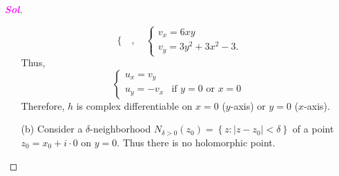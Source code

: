 \documentclass{article}
\theoremstyle{definition}
\newcommand{\set}[1]{\left\{#1\right\}}
\newcommand{\abs}[1]{\left\lvert #1 \right\rvert}
\newcommand{\sol}{\textcolor{magenta}{\bf Sol}}
\begin{document}
\begin{enumerate}
\begin{proof}[\sol]
\begin{itemize}
\[\begin{cases}
			\end{cases},\quad
			\begin{cases}
				v_x=6xy\\
				v_y=3y^2+3x^2-3.
			\end{cases}
			\] Thus, \[\begin{cases}
				u_x=v_y&\\
				u_y=-v_x &\text{if $y=0$ or $x=0$}
			\end{cases}
			\] Therefore, $h$ is complex differentiable on $x=0$ ($y$-axis) or $y=0$ ($x$-axis).
			\vspace{4pt}
			\item[(b)] Consider a $\delta$-neighborhood $N_{\delta>0}(z_0)=\set{z:\abs{z-z_0}<\delta}$ of a point $z_0=x_0+i\cdot 0$ on $y=0$. Thus there is no holomorphic point.
		\end{itemize}
	\end{proof}
	

\end{enumerate}
\end{document}
